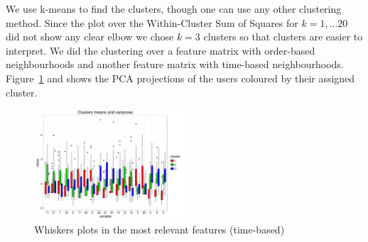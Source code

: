 \documentclass[conference]{IEEEtran}
\begin{document}
We use k-means to find the clusters, though one can use any other clustering method. Since the plot over the Within-Cluster Sum of Squares for $k=1,...20$ did not show any clear elbow we chose $k=3$ clusters so that clusters are easier to interpret. We did the clustering over a feature matrix with order-based neighbourhoods and another feature matrix with time-based neighbourhoods. Figure~\ref{fig:PCA} and shows the PCA projections of the users coloured by their assigned cluster. 

\begin{figure}
	\centering
	\includegraphics[width=0.5\textwidth]{whiskers}
	\caption{Whiskers plots in the most relevant features (time-based)}
	\label{fig:PCA}
\end{figure}



\end{document}
